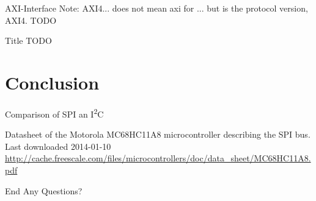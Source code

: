 \documentclass[]{beamer} %
\newcommand{\twi}{I\textsuperscript{2}C\xspace}
\begin{document}
\begin{frame}{AXI-Interface}
	Note: AXI4... does not mean axi for ... but is the protocol version, AXI4.
	TODO
\end{frame}

\begin{frame}{Title}
	TODO
\end{frame}



\section[Conclusion]{Conclusion}


\begin{frame}[fragile]{Comparison of SPI an \twi}
\end{frame}







\tiny
\begin{thebibliography}{9}
		Datasheet of the Motorola MC68HC11A8 microcontroller describing the SPI bus.\\
		Last downloaded 2014-01-10\\
		\url{http://cache.freescale.com/files/microcontrollers/doc/data_sheet/MC68HC11A8.pdf}

\end{thebibliography}


\begin{frame}
	{\Huge End}
	Any Questions?
\end{frame}
\end{document}

